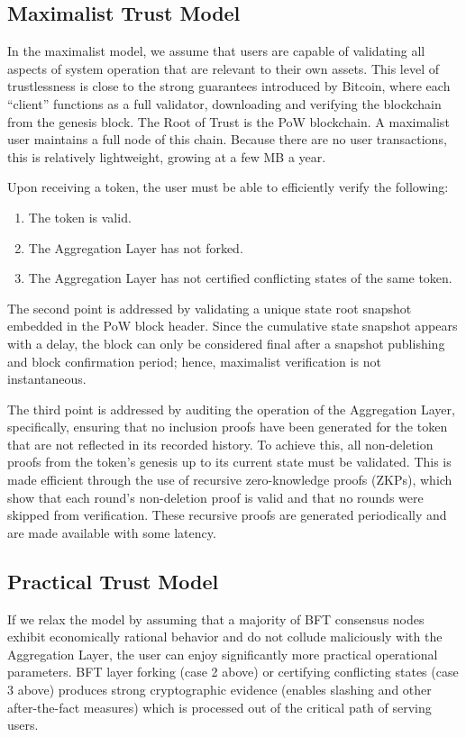 \documentclass{article}
\begin{document}
\subsection{Maximalist Trust Model}

In the maximalist model, we assume that users are capable of validating all aspects of system operation that are relevant to their own assets. This level of trustlessness is close to the strong guarantees introduced by Bitcoin, where each ``client'' functions as a full validator, downloading and verifying the blockchain from the genesis block. The Root of Trust is the PoW blockchain. A maximalist user maintains a full node of this chain. Because there are no user transactions, this is relatively lightweight, growing at a few MB a year.

Upon receiving a token, the user must be able to efficiently verify the following:
\begin{enumerate}
    \item The token is valid.
    \item The Aggregation Layer has not forked.
    \item The Aggregation Layer has not certified conflicting states of the same token.
\end{enumerate}

The second point is addressed by validating a unique state root snapshot embedded in the PoW block header. Since the cumulative state snapshot appears with a delay, the block can only be considered final after a snapshot publishing and block confirmation period; hence, maximalist verification is not instantaneous.

The third point is addressed by auditing the operation of the Aggregation Layer, specifically, ensuring that no inclusion proofs have been generated for the token that are not reflected in its recorded history. To achieve this, all non-deletion proofs from the token's genesis up to its current state must be validated. This is made efficient through the use of recursive zero-knowledge proofs (ZKPs), which show that each round's non-deletion proof is valid and that no rounds were skipped from verification. These recursive proofs are generated periodically and are made available with some latency.

\subsection{Practical Trust Model}

If we relax the model by assuming that a majority of BFT consensus nodes exhibit economically rational behavior and do not collude maliciously with the Aggregation Layer, the user can enjoy significantly more practical operational parameters. BFT layer forking (case 2 above) or certifying conflicting states (case 3 above) produces strong cryptographic evidence (enables slashing and other after-the-fact measures) which is processed out of the critical path of serving users.
\end{document}
